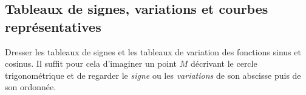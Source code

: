 \documentclass[a4paper,11pt]{article}
\begin{document}
\pagebreak

\subsection{Tableaux de signes, variations et courbes représentatives}

\begin{cexercice}
Dresser les tableaux de signes et les tableaux de variation des fonctions sinus et cosinus. Il suffit pour cela d'imaginer un point $M$ décrivant le cercle trigonométrique et de regarder le \textit{signe} ou les \textit{variations} de son abscisse puis de son ordonnée.

\begin{center}
\end{center}

\begin{center}
\end{center}

\begin{center}
\end{center}

\begin{center}
\end{center}
\end{cexercice}
\end{document}
